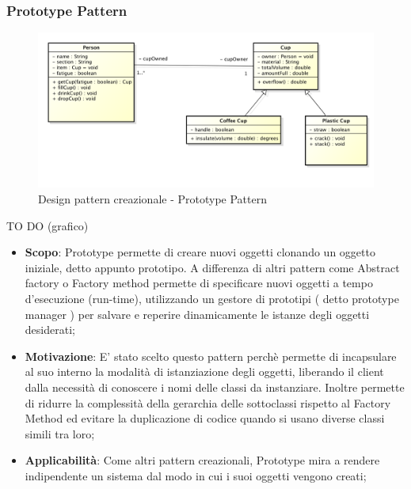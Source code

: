 		\subsubsection{Prototype Pattern} %

		\begin{figure}[htbp]
			\centering
			\centerline{\includegraphics[scale=0.3]{./images/example_graph.png}}
			\caption{Design pattern creazionale - Prototype Pattern}
		\end{figure}
		TO DO (grafico)
		
		
		\begin{itemize}
			\item \textbf{Scopo}: Prototype permette di creare nuovi oggetti clonando un oggetto iniziale, detto appunto prototipo. A differenza di altri pattern come Abstract factory o Factory method permette di specificare nuovi oggetti a tempo d'esecuzione (run-time), utilizzando un gestore di prototipi ( detto prototype manager ) per salvare e reperire dinamicamente le istanze degli oggetti desiderati;
			
			\item \textbf{Motivazione}: E' stato scelto questo pattern perchè permette di incapsulare al suo interno la modalità di istanziazione degli oggetti, liberando il client dalla necessità di conoscere i nomi delle classi da instanziare. Inoltre permette di ridurre la complessità della gerarchia delle sottoclassi rispetto al Factory Method ed evitare la duplicazione di codice quando si usano diverse classi simili tra loro;
			
			\item \textbf{Applicabilità}: Come altri pattern creazionali, Prototype mira a rendere indipendente un sistema dal modo in cui i suoi oggetti vengono creati;
			
		\end{itemize}
		
